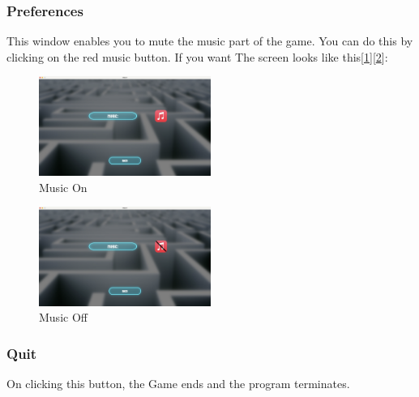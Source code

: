 \documentclass[10pt]{article}
\begin{document}
    \subsubsection{Preferences}
    This window enables you to mute the music part of the game.
    You can do this by clicking on the red music button.
    If you want
    The screen looks like this[\ref{fig:PreferencesOn}][\ref{fig:PreferencesOff}]:
    \begin{figure}[h!]
        \centering
        \includegraphics[width=0.5\textwidth]{PreferencesSoundOn}
        \caption{Music On}\label{fig:PreferencesOn}
    \end{figure}
    \begin{figure}[h!]
        \centering
        \includegraphics[width=0.5\textwidth]{PreferencesSoundOff}
        \caption{Music Off}\label{fig:PreferencesOff}
    \end{figure}

    \subsubsection{Quit}
    On clicking this button, the Game ends and the program terminates.
\end{document}
